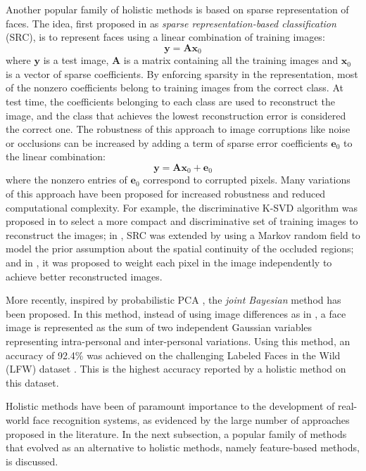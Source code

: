 \documentclass[conference]{IEEEtran}
\begin{document}
Another popular family of holistic methods is based on sparse representation of faces. The idea, first proposed in \cite{wright2009robust} as \textit{sparse representation-based classification} (SRC), is to represent faces using a linear combination of training images:
\begin{equation}
    \bm{y} = \bm{A}\bm{x}_0
    \label{eq:src_representation}
\end{equation}
where $\bm{y}$ is a test image, $\bm{A}$ is a matrix containing all the training images and $\bm{x}_0$ is a vector of sparse coefficients. By enforcing sparsity in the representation, most of the nonzero coefficients belong to training images from the correct class. At test time, the coefficients belonging to each class are used to reconstruct the image, and the class that achieves the lowest reconstruction error is considered the correct one. The robustness of this approach to image corruptions like noise or occlusions can be increased by adding a term of sparse error coefficients $\bm{e}_0$ to the linear combination:
\begin{equation}
    \bm{y} = \bm{A}\bm{x}_0+\bm{e}_0
    \label{eq:src_representation_corrupted}
\end{equation}
where the nonzero entries of $\bm{e}_0$ correspond to corrupted pixels. Many variations of this approach have been proposed for increased robustness and reduced computational complexity. For example, the discriminative K-SVD algorithm was proposed in \cite{zhang2010discriminative} to select a more compact and discriminative set of training images to reconstruct the images; in \cite{zhou2009face}, SRC was extended by using a Markov random field to model the prior assumption about the spatial continuity of the occluded regions; and in \cite{jia2008face}, it was proposed to weight each pixel in the image independently to achieve better reconstructed images.

More recently, inspired by probabilistic PCA \cite{moghaddam1998beyond}, the \textit{joint Bayesian} method \cite{chen2012bayesian} has been proposed. In this method, instead of using image differences as in \cite{moghaddam1998beyond}, a face image is represented as the sum of two independent Gaussian variables representing intra-personal and inter-personal variations. Using this method, an accuracy of 92.4\% was achieved on the challenging Labeled Faces in the Wild (LFW) dataset \cite{huang2007labeled}. This is the highest accuracy reported by a holistic method on this dataset.

Holistic methods have been of paramount importance to the development of real-world face recognition systems, as evidenced by the large number of approaches proposed in the literature. In the next subsection, a popular family of methods that evolved as an alternative to holistic methods, namely feature-based methods, is discussed.
\end{document}
